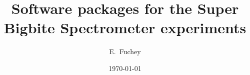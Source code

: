 \documentclass[11pt]{article}
\begin{document}
\title{ {Software packages for the Super Bigbite Spectrometer experiments}}

%
\author{E.~Fuchey}

\date{\today}

\maketitle

\newpage

%
%
\linenumbers
%
\newpage





%
\end{document}
